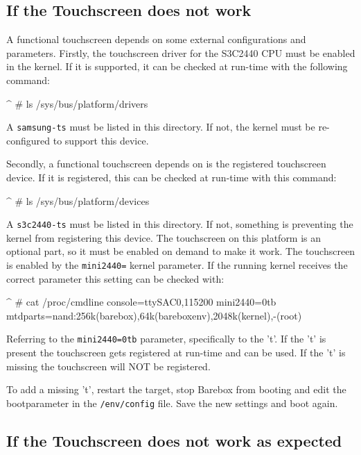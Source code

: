 \subsection{If the Touchscreen does not work}

A functional touchscreen depends on some external configurations and parameters.
Firstly, the touchscreen driver for the S3C2440 CPU must be enabled in the
kernel. If it is supported, it can be checked at run-time with the following
command:

\begin{ptxshell}[escapechar=|]{^}
# ls /sys/bus/platform/drivers
\end{ptxshell}

A \texttt{samsung-ts} must be listed in this directory. If not, the kernel
must be re-configured to support this device.

Secondly, a functional touchscreen depends on is the registered touchscreen
device. If it is registered, this can be checked at run-time with this command:

\begin{ptxshell}[escapechar=|]{^}
# ls /sys/bus/platform/devices
\end{ptxshell}

A \texttt{s3c2440-ts} must be listed in this directory. If not, something
is preventing the kernel from registering this device. The touchscreen on this
platform is an optional part, so it must be enabled on demand to make it work.
The touchscreen is enabled by the \texttt{mini2440=} kernel parameter. If the
running kernel receives the correct parameter this setting can be checked with:

\begin{ptxshell}[escapechar=|]{^}
# cat /proc/cmdline
console=ttySAC0,115200 mini2440=0tb mtdparts=nand:256k(barebox),64k(bareboxenv),2048k(kernel),-(root)
\end{ptxshell}

Referring to the \texttt{mini2440=0tb} parameter, specifically to the 't'.
If the 't' is present the touchscreen gets registered at run-time and can be
used. If the 't' is missing the touchscreen will NOT be registered.

To add a missing 't', restart the target, stop Barebox from booting and edit
the bootparameter in the \texttt{/env/config} file. Save the new settings and
boot again.

\subsection{If the Touchscreen does not work as expected}

